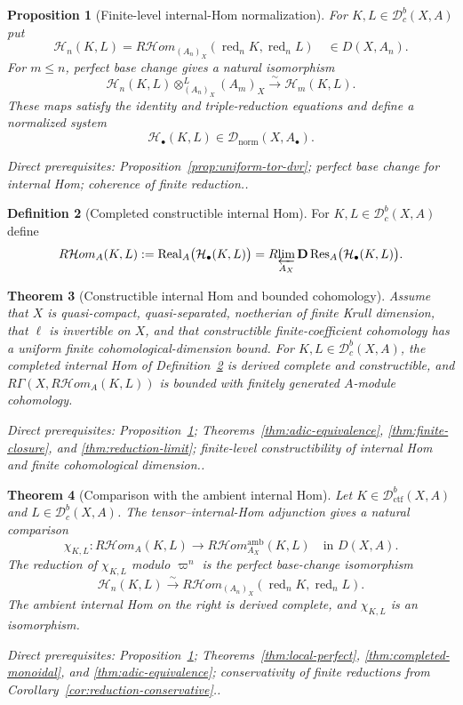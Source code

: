 \documentclass[10pt]{article}
\newtheorem{theorem}{Theorem}[section]
\newtheorem{proposition}[theorem]{Proposition}
\theoremstyle{definition}
\newtheorem{definition}[theorem]{Definition}
\newcommand{\Dbc}{\mathcal D^b_c}
\newcommand{\Dctf}{\mathcal D^b_{\mathrm{ctf}}}
\newcommand{\Dnorm}{\mathcal D_{\mathrm{norm}}}
\newcommand{\Rlim}{R\!\varprojlim}
\newcommand{\depends}[1]{\par\smallskip\noindent\textit{Direct prerequisites:} #1.}
\begin{document}
\begin{proposition}[Finite-level internal-Hom normalization]
\label{prop:internal-hom-normalization}
For $K,L\in\Dbc(X,A)$ put
\[
 \mathcal H_n(K,L)=
 R\mathcal Hom_{(A_n)_X}
   (\operatorname{red}_nK,\operatorname{red}_nL)
 \quad\in D(X,A_n).
\]
For $m\leq n$, perfect base change gives a natural isomorphism
\[
 \mathcal H_n(K,L)\otimes^L_{(A_n)_X}(A_m)_X
 \xrightarrow{\sim}\mathcal H_m(K,L).
\]
These maps satisfy the identity and triple-reduction equations and define a
normalized system
\[
 \mathcal H_\bullet(K,L)\in\Dnorm(X,A_\bullet).
\]
\depends{Proposition~\ref{prop:uniform-tor-dvr}; perfect base change for
internal Hom; coherence of finite reduction.}
\end{proposition}

\begin{definition}[Completed constructible internal Hom]
\label{def:completed-internal-hom}
For $K,L\in\Dbc(X,A)$ define
\[
 R\mathcal Hom_A(K,L):=
 \operatorname{Real}_A\bigl(\mathcal H_\bullet(K,L)\bigr)
 =\Rlim_{A_X}\mathbf D\operatorname{Res}_A
   \bigl(\mathcal H_\bullet(K,L)\bigr).
\]
\end{definition}

\begin{theorem}[Constructible internal Hom and bounded cohomology]
\label{thm:constructible-internal-hom}
Assume that $X$ is quasi-compact, quasi-separated, noetherian of finite
Krull dimension, that $\ell$ is invertible on $X$, and that constructible
finite-coefficient cohomology has a uniform finite cohomological-dimension
bound.  For $K,L\in\Dbc(X,A)$, the completed internal Hom of
Definition~\ref{def:completed-internal-hom} is derived complete and
constructible, and
$R\Gamma(X,R\mathcal Hom_A(K,L))$ is bounded with finitely generated
$A$-module cohomology.
\depends{Proposition~\ref{prop:internal-hom-normalization};
Theorems~\ref{thm:adic-equivalence},
\ref{thm:finite-closure}, and \ref{thm:reduction-limit}; finite-level
constructibility of internal Hom and finite cohomological dimension.}
\end{theorem}

\begin{theorem}[Comparison with the ambient internal Hom]
\label{thm:ambient-internal-hom-comparison}
Let $K\in\Dctf(X,A)$ and $L\in\Dbc(X,A)$.  The tensor--internal-Hom
adjunction gives a natural comparison
\[
 \chi_{K,L}:R\mathcal Hom_A(K,L)
 \longrightarrow R\mathcal Hom_{A_X}^{\mathrm{amb}}(K,L)
 \quad\text{in }D(X,A).
\]
The reduction of $\chi_{K,L}$ modulo $\varpi^n$ is the perfect base-change
isomorphism
\[
 \mathcal H_n(K,L)
 \xrightarrow{\sim}
 R\mathcal Hom_{(A_n)_X}
  (\operatorname{red}_nK,\operatorname{red}_nL).
\]
The ambient internal Hom on the right is derived complete, and
$\chi_{K,L}$ is an isomorphism.
\depends{Proposition~\ref{prop:internal-hom-normalization};
Theorems~\ref{thm:local-perfect}, \ref{thm:completed-monoidal}, and
\ref{thm:adic-equivalence}; conservativity of finite reductions from
Corollary~\ref{cor:reduction-conservative}.}
\end{theorem}
\end{document}
